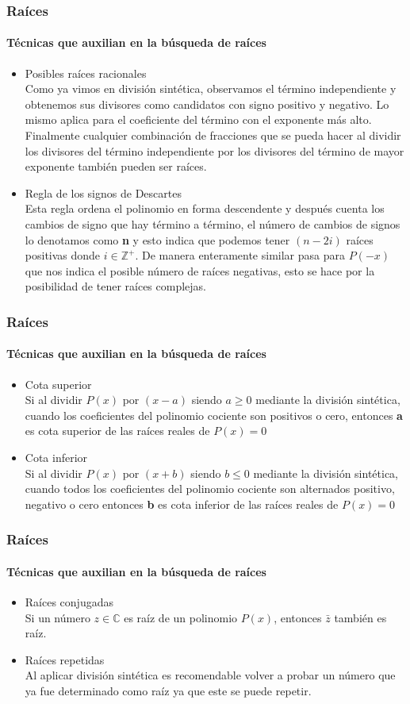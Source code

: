 \documentclass[11pt]{beamer}
\begin{document}
\begin{frame}
\frametitle{Raíces}
\framesubtitle{Técnicas que auxilian en la búsqueda de raíces}
\begin{itemize}
\item Posibles raíces racionales\\
Como ya vimos en división sintética, observamos el término independiente y obtenemos sus divisores como candidatos con signo positivo y negativo. Lo mismo aplica para el coeficiente del término con el exponente más alto. Finalmente cualquier combinación de fracciones que se pueda hacer al dividir los divisores del término independiente por los divisores del término de mayor exponente también pueden ser raíces.
\item Regla de los signos de Descartes\\
Esta regla ordena el polinomio en forma descendente y después cuenta los cambios de signo que hay término a término, el número de cambios de signos lo denotamos como \textbf{n} y esto indica que podemos tener $(n-2i)$ raíces positivas donde $i\in \mathbb{Z}^+$. De manera enteramente similar pasa para $P(-x)$ que nos indica el posible número de raíces negativas, esto se hace por la posibilidad de tener raíces complejas. 
\end{itemize}
\end{frame}

\begin{frame}
\frametitle{Raíces}
\framesubtitle{Técnicas que auxilian en la búsqueda de raíces}
\begin{itemize}
\item Cota superior\\
Si al dividir $P(x)$ por $(x-a)$ siendo $a\geq 0$ mediante la división sintética,
cuando los coeficientes del polinomio cociente son positivos o
cero, entonces \textbf{a} es cota superior de las raíces reales de $P(x) = 0$\\
\item Cota inferior\\
Si al dividir $P(x)$ por $(x + b)$ siendo $b\leq 0$ mediante la división sintética,
cuando todos los coeficientes del polinomio cociente son
alternados positivo, negativo o cero entonces \textbf{b} es cota inferior de
las raíces reales de $P(x) = 0$
\end{itemize}
\end{frame}

\begin{frame}
\frametitle{Raíces}
\framesubtitle{Técnicas que auxilian en la búsqueda de raíces}
\begin{itemize}
\item Raíces conjugadas\\
Si un número $z\in \mathbb{C}$ es raíz de un polinomio $P(x)$, entonces $\bar{z}$ también es raíz.\\
\item Raíces repetidas\\
Al aplicar división sintética es recomendable volver a probar un número que ya fue determinado como raíz ya que este se puede repetir.
\end{itemize}
\end{frame}
\end{document}
